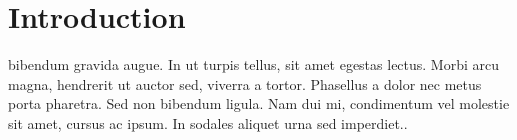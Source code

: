 \section{Introduction}
 bibendum gravida augue. In ut turpis tellus, sit amet egestas lectus. Morbi arcu magna, hendrerit ut auctor sed, viverra a tortor. Phasellus a dolor nec metus porta pharetra. Sed non bibendum ligula. Nam dui mi, condimentum vel molestie sit amet, cursus ac ipsum. In sodales aliquet urna sed imperdiet.\cite{freedman}.
